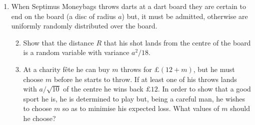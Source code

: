 \documentclass[a4, 11pt]{report}
\newlength{\qspace}
\newcounter{qnumber}
\newenvironment{question}%
 {\vspace{\qspace}
  \begin{enumerate}[\bfseries 1\quad][10]%
    \setcounter{enumi}{\value{qnumber}}%
    \item%
 }
{
  \end{enumerate}
  \filbreak
  \stepcounter{qnumber}
 }
\newenvironment{questionparts}[1][1]%
 {
  \begin{enumerate}[\bfseries (i)]%
    \setcounter{enumii}{#1}
    \addtocounter{enumii}{-1}
    \setlength{\itemsep}{5mm}
    \setlength{\parskip}{8pt}
 }
 {
  \end{enumerate}
 }
\begin{document}
\begin{question}
	When Septimus Moneybags throws darts at a dart board they are certain
	to end on the board (a disc of radius $a$) but, it must be admitted,
	otherwise are uniformly randomly distributed over the board. 

	\begin{questionparts}
	\item Show that the distance $R$ that his shot lands from the centre of
	the board is a random variable with variance $a^{2}/18.$
	
	\item At a charity fête he can buy $m$ throws for $\pounds(12+m)$, but
	he must choose $m$ before he starts to throw. If at least one of
	his throws lands with $a/\sqrt{10}$ of the centre he wins back $\pounds 12$.
	In order to show that a good sport he is, he is determined to play
	but, being a careful man, he wishes to choose $m$ so as to minimise
	his expected loss. What values of $m$ should he choose? 
\end{questionparts}
\end{question}
	
\end{document}
